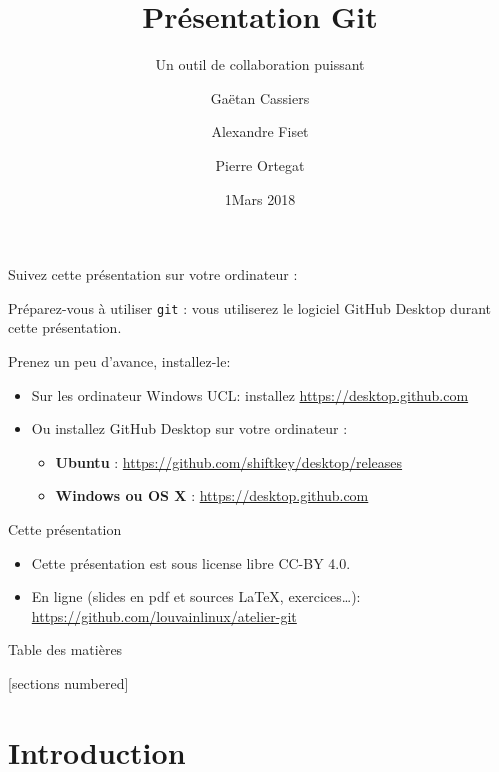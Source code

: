 \documentclass{beamer}
\title{Présentation Git}
\subtitle{Un outil de collaboration puissant}
\date{1\ier Mars 2018}
\author{Gaëtan Cassiers \and Alexandre Fiset \and Pierre Ortegat}
\institute{KAP Louvain-li-Nux}
\begin{document}
\begin{frame}
\begin{center}
  Suivez cette présentation sur votre ordinateur :

\end{center}

Préparez-vous à utiliser \texttt{git} :
vous utiliserez le logiciel GitHub Desktop durant cette présentation.

Prenez un peu d'avance, installez-le:
\begin{itemize}
    \item Sur les ordinateur Windows UCL: installez
            \url{https://desktop.github.com}
    \item Ou installez GitHub Desktop sur votre ordinateur :
    \begin{itemize}
        \item \textbf{Ubuntu} : {\footnotesize{\url{https://github.com/shiftkey/desktop/releases}}}
        \item \textbf{Windows ou OS X} : \url{https://desktop.github.com}
    \end{itemize}
\end{itemize}
\end{frame}


\maketitle

\begin{frame}{Cette présentation}
    \begin{itemize}
        \item Cette présentation est sous license libre CC-BY 4.0.
        \item En ligne (slides en pdf et sources \LaTeX, exercices\ldots):
            \url{https://github.com/louvainlinux/atelier-git}
    \end{itemize}
\end{frame}

\begin{frame}{Table des matières}

[sections numbered]
\tableofcontents[hideallsubsections]

\end{frame}

\section{Introduction}
\end{document}
